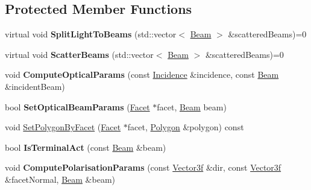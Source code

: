 \subsection*{Protected Member Functions}
\begin{DoxyCompactItemize}
\item 
\mbox{\label{class_scattering_a781dd840b4d4e70db1e86a4d12420cec}} 
virtual void {\bfseries Split\+Light\+To\+Beams} (std\+::vector$<$ \mbox{\hyperlink{class_beam}{Beam}} $>$ \&scattered\+Beams)=0
\item 
\mbox{\label{class_scattering_a785c2bb1080e9cd0cdf00c75ac82299c}} 
virtual void {\bfseries Scatter\+Beams} (std\+::vector$<$ \mbox{\hyperlink{class_beam}{Beam}} $>$ \&scattered\+Beams)=0
\item 
\mbox{\label{class_scattering_ac5a9e79817c487d63f422a9abb529b45}} 
void {\bfseries Compute\+Optical\+Params} (const \mbox{\hyperlink{class_incidence}{Incidence}} \&incidence, const \mbox{\hyperlink{class_beam}{Beam}} \&incident\+Beam)
\item 
\mbox{\label{class_scattering_aad22434637775b6f2eb881419935316a}} 
bool {\bfseries Set\+Optical\+Beam\+Params} (\mbox{\hyperlink{class_facet}{Facet}} $\ast$facet, \mbox{\hyperlink{class_beam}{Beam}} beam)
\item 
void \mbox{\hyperlink{class_scattering_abdf7a6563ec37996654fa59ab99bab3f}{Set\+Polygon\+By\+Facet}} (\mbox{\hyperlink{class_facet}{Facet}} $\ast$facet, \mbox{\hyperlink{class_polygon}{Polygon}} \&polygon) const
\item 
\mbox{\label{class_scattering_abe93cd1898e52b1601c96735020454fe}} 
bool {\bfseries Is\+Terminal\+Act} (const \mbox{\hyperlink{class_beam}{Beam}} \&beam)
\item 
\mbox{\label{class_scattering_a104a9e3ee72b4449d239f29303556811}} 
void {\bfseries Compute\+Polarisation\+Params} (const \mbox{\hyperlink{struct_point3f}{Vector3f}} \&dir, const \mbox{\hyperlink{struct_point3f}{Vector3f}} \&facet\+Normal, \mbox{\hyperlink{class_beam}{Beam}} \&beam)
\item 
\mbox{\label{class_scattering_acccb70145215368218d90cf4bd93b63b}} 

\end{DoxyCompactItemize}
